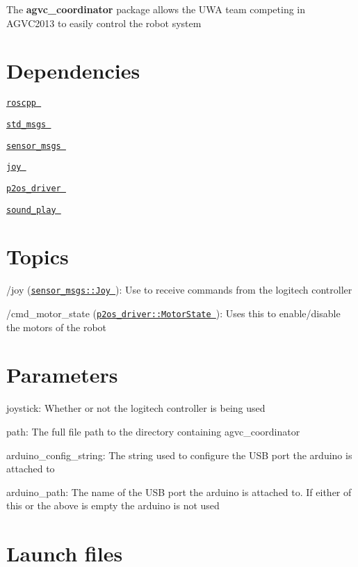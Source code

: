\-The {\bfseries agvc\-\_\-coordinator} package allows the \-U\-W\-A team competing in \-A\-G\-V\-C2013 to easily control the robot system\hypertarget{index_dependencies}{}\section{\-Dependencies}\label{index_dependencies}

\begin{DoxyItemize}
\item {\ttfamily } \href{http://wiki.ros.org/roscpp}{\tt roscpp }
\item {\ttfamily } \href{http://wiki.ros.org/std_msgs}{\tt std\-\_\-msgs }
\item {\ttfamily } \href{http://wiki.ros.org/sensor_msgs}{\tt sensor\-\_\-msgs }
\item {\ttfamily } \href{http://wiki.ros.org/joy}{\tt joy }
\item {\ttfamily } \href{http://wiki.ros.org/p2os_driver?distro=groovy}{\tt p2os\-\_\-driver }
\item {\ttfamily } \href{http://wiki.ros.org/sound_play}{\tt sound\-\_\-play }
\end{DoxyItemize}\hypertarget{index_tops}{}\section{\-Topics}\label{index_tops}

\begin{DoxyItemize}
\item {\ttfamily /joy} (\href{http://docs.ros.org/api/sensor_msgs/html/msg/Joy.html}{\tt sensor\-\_\-msgs\-::\-Joy })\-: \-Use to receive commands from the logitech controller
\item {\ttfamily /cmd\-\_\-motor\-\_\-state} (\href{http://docs.ros.org/diamondback/api/p2os_driver/html/msg/MotorState.html}{\tt p2os\-\_\-driver\-::\-Motor\-State })\-: \-Uses this to enable/disable the motors of the robot
\end{DoxyItemize}\hypertarget{index_param}{}\section{\-Parameters}\label{index_param}

\begin{DoxyItemize}
\item {\ttfamily joystick\-:} \-Whether or not the logitech controller is being used
\item {\ttfamily path\-:} \-The full file path to the directory containing agvc\-\_\-coordinator
\item {\ttfamily arduino\-\_\-config\-\_\-string\-:} \-The string used to configure the \-U\-S\-B port the arduino is attached to
\item {\ttfamily arduino\-\_\-path\-:} \-The name of the \-U\-S\-B port the arduino is attached to. \-If either of this or the above is empty the arduino is not used
\end{DoxyItemize}\hypertarget{index_launch}{}\section{\-Launch files}\label{index_launch}

